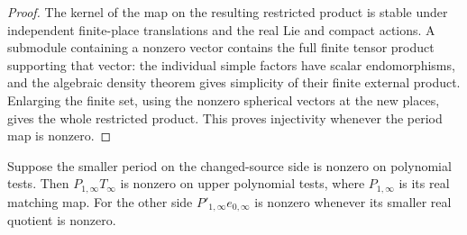 \begin{proof}
The kernel of the map on the resulting restricted product is stable
under independent finite-place translations and the real Lie and
compact actions. A submodule containing a nonzero vector contains
the full finite tensor product supporting that vector: the individual
simple factors have scalar endomorphisms, and the algebraic density
theorem gives simplicity of their finite external product. Enlarging
the finite set, using the nonzero spherical vectors at the new
places, gives the whole restricted product. This proves injectivity
whenever the period map is nonzero.
\end{proof}

\begin{lemma}\label{tcr:bump}
Suppose the smaller period on the changed-source side is nonzero
on polynomial tests. Then \(P_{1,\infty}T_\infty\) is nonzero on
upper polynomial tests, where \(P_{1,\infty}\) is its real matching
map. For the other side \(P'_{1,\infty}e_{0,\infty}\) is nonzero
whenever its smaller real quotient is nonzero.
\end{lemma}
